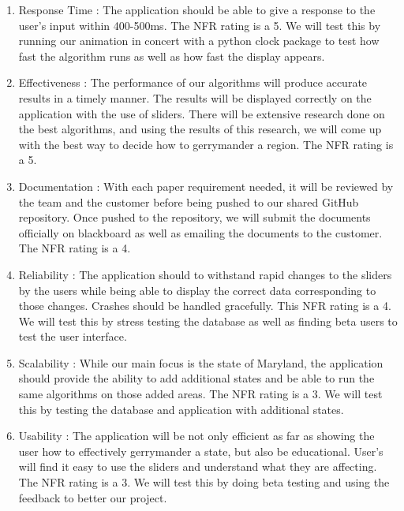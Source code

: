 \documentclass{article}
\begin{document}
\begin{addmargin}[2em]{0em}
\begin{enumerate}

\item Response Time : The application should be able to give a response to the user's input within 400-500ms. The NFR rating is a 5. We will test this by running our animation in concert with a python clock package to test how fast the algorithm runs as well as how fast the display appears.

\item Effectiveness : The performance of our algorithms will produce accurate results in a timely manner. The results will be displayed correctly on the application with the use of sliders. There will be extensive research done on the best algorithms, and using the results of this research, we will come up with the best way to decide how to gerrymander a region. The NFR rating is a 5.

\item Documentation : With each paper requirement needed, it will be reviewed by the team and the customer before being pushed to our shared GitHub repository. Once pushed to the repository, we will submit the documents officially on blackboard as well as emailing the documents to the customer. The NFR rating is a 4. 

\item Reliability : The application should to withstand rapid changes to the sliders by the users while being able to display the correct data corresponding to those changes. Crashes should be handled gracefully. This NFR rating is a 4. We will test this by stress testing the database as well as finding beta users to test the user interface.

\item Scalability : While our main focus is the state of Maryland, the application should provide the ability to add additional states and be able to run the same algorithms on those added areas. The NFR rating is a 3. We will test this by testing the database and application with additional states.

\item Usability : The application will be not only efficient as far as showing the user how to effectively gerrymander a state, but also be educational. User's will find it easy to use the sliders and understand what they are affecting. The NFR rating is a 3. We will test this by doing beta testing and using the feedback to better our project. 


\end{enumerate}
\end{addmargin}
\end{document}
